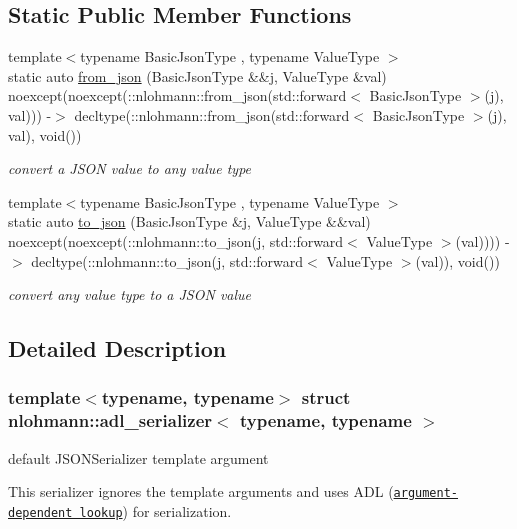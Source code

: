 \subsection*{Static Public Member Functions}
\begin{DoxyCompactItemize}
\item 
{\footnotesize template$<$typename Basic\+Json\+Type , typename Value\+Type $>$ }\\static auto \hyperlink{structnlohmann_1_1adl__serializer_a2c544585b8b1828a0f1eecd831d0496e}{from\+\_\+json} (Basic\+Json\+Type \&\&j, Value\+Type \&val) noexcept(noexcept(\+::nlohmann\+::from\+\_\+json(std\+::forward$<$ Basic\+Json\+Type $>$(j), val))) -\/$>$ decltype(\+::nlohmann\+::from\+\_\+json(std\+::forward$<$ Basic\+Json\+Type $>$(j), val), void())
\begin{DoxyCompactList}\small\item\em convert a J\+S\+ON value to any value type \end{DoxyCompactList}\item 
{\footnotesize template$<$typename Basic\+Json\+Type , typename Value\+Type $>$ }\\static auto \hyperlink{structnlohmann_1_1adl__serializer_a01b867bd5dce5249d4f7433b8f27def6}{to\+\_\+json} (Basic\+Json\+Type \&j, Value\+Type \&\&val) noexcept(noexcept(\+::nlohmann\+::to\+\_\+json(j, std\+::forward$<$ Value\+Type $>$(val)))) -\/$>$ decltype(\+::nlohmann\+::to\+\_\+json(j, std\+::forward$<$ Value\+Type $>$(val)), void())
\begin{DoxyCompactList}\small\item\em convert any value type to a J\+S\+ON value \end{DoxyCompactList}\end{DoxyCompactItemize}


\subsection{Detailed Description}
\subsubsection*{template$<$typename, typename$>$\newline
struct nlohmann\+::adl\+\_\+serializer$<$ typename, typename $>$}

default J\+S\+O\+N\+Serializer template argument 

This serializer ignores the template arguments and uses A\+DL (\href{https://en.cppreference.com/w/cpp/language/adl}{\tt argument-\/dependent lookup}) for serialization. 

